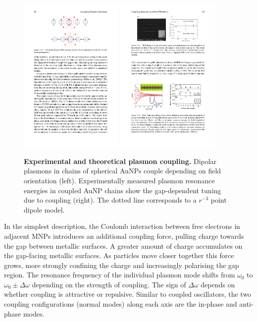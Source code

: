 \documentclass{article}
\begin{document}
\begin{figure}[bt]
\centering
\includegraphics[width=0.45\textwidth]{figures/literature/maier_plasmonics_coupling_diagram}
\quad
\includegraphics[width=0.45\textwidth]{figures/literature/maier_plasmonics_coupling}
\caption[Experimental and theoretical plasmon coupling]{\textbf{Experimental and theoretical plasmon coupling.} Dipolar plasmons in chains of spherical AuNPs couple depending on field orientation \cite{maier2007plasmonics} (left). Experimentally measured plasmon resonance energies in coupled AuNP chains show the gap-dependent tuning due to coupling \cite{maier2002} (right). The dotted line corresponds to a $r^{-3}$ point dipole model.}
\label{fig:maier_plasmon_coupling}
\end{figure}

In the simplest description, the Coulomb interaction between free electrons in adjacent MNPs introduces an additional coupling force, pulling charge towards the gap between metallic surfaces. A greater amount of charge accumulates on the gap-facing metallic surfaces. As particles move closer together this force grows, more strongly confining the charge and increasingly polarising the gap region. The resonance frequency of the individual plasmon mode shifts from $\omega_0$ to $\omega_0\pm\Delta\omega$ depending on the strength of coupling. The sign of $\Delta\omega$ depends on whether coupling is attractive or repulsive. Similar to coupled oscillators, the two coupling configurations (normal modes) along each axis are the in-phase and anti-phase modes.
\end{document}
